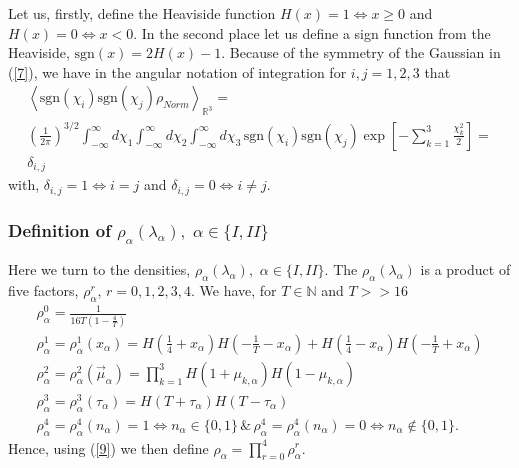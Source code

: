 \documentclass{appolb}
\newcommand{\sgn}{\text{sgn}}
\begin{document}
Let us, firstly,  define the Heaviside function $H(x)=1 \Leftrightarrow x \geq 0$ and $H(x)=0 \Leftrightarrow x<0$. In the second place let us define a sign function from the Heaviside,  $\sgn(x)=2H(x)-1$. 
Because of the symmetry of the Gaussian in (\ref{7}), we have in the angular notation of integration for $i,j=1,2,3$ that 
\begin{eqnarray}\label{8a}
\left\langle \sgn(\chi_{i})\sgn(\chi_{j}) \rho_{Norm}\right\rangle_{\mathbb{R}^3}  =
\nonumber \\
\left( \frac{1}{2\pi} \right)^{3/2}\int_{-\infty}^{\infty}d\chi_1\int_{-\infty}^{\infty}d\chi_2 \int_{-\infty}^{\infty}d\chi_3\, \sgn(\chi_{i})\sgn(\chi_{j}) \exp\left[ -  \sum_{k=1}^3 \frac{\chi_k^2}{2}\right] 
= \nonumber\\
\delta_{i,j}
\end{eqnarray}
with, $\delta_{i,j}=1 \Leftrightarrow i=j$ and $\delta_{i,j}=0 \Leftrightarrow i\neq j$.
\subsubsection{Definition of $ \rho_{\alpha}(\lambda_{\alpha}),\,\,\alpha\in\{I,II\} $}
Here we turn to the densities,  $ \rho_{\alpha}(\lambda_{\alpha}),\,\,\alpha\in\{I,II\} $.
The $\rho_{\alpha}(\lambda_{\alpha})$ is a product of five factors, $\rho_{\alpha}^{r}$, $r=0,1,2,3,4$.
We have, for $T \in \mathbb{N}$ and $T>>16$
\begin{eqnarray}\label{9}
\rho_{\alpha}^{0}=\frac{1}{16T\left(1-\frac{4}{T}\right)}\nonumber\\
\rho_{\alpha}^{1}=\rho_{\alpha}^{1}(x_{\alpha})=H\left(\frac{1}{4}+x_{\alpha}\right)H\left( -\frac{1}{T}-x_{\alpha}\right)+H\left(\frac{1}{4}-x_{\alpha}\right)H\left( -\frac{1}{T}+x_{\alpha}\right)\nonumber\\
\rho_{\alpha}^{2}=\rho_{\alpha}^{2}(\vec{\mu}_{\alpha})=\prod_{k=1}^3 H\left( 1+\mu_{k,\alpha}\right)H\left( 1- \mu_{k,\alpha}\right) \nonumber \\
\rho_{\alpha}^{3}=\rho_{\alpha}^{3}(\tau_{\alpha})=H\left( T+\tau_{\alpha}\right)H\left( T- \tau_{\alpha}\right)\nonumber \\
\rho_{\alpha}^{4}=\rho_{\alpha}^{4}(n_{\alpha})=1 \Leftrightarrow n_{\alpha}\in \{0,1\} \,\&\, \rho_{\alpha}^{4}=\rho_{\alpha}^{4}(n_{\alpha})=0 \Leftrightarrow n_{\alpha}\notin \{0,1\}.
\end{eqnarray}
Hence, using (\ref{9}) we then define $\rho_{\alpha}=\prod_{r=0}^4 \rho_{\alpha}^{r}$. 
\end{document}
